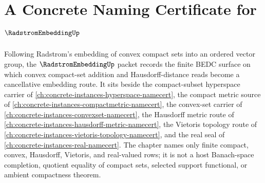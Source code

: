\chapter{A Concrete Naming Certificate for $\RadstromEmbeddingUp$}
\label{ch:concrete-instances-radstrom-embedding-namecert}

Following Radstrom's embedding of convex compact sets into an ordered vector group, the $\RadstromEmbeddingUp$ packet records the finite BEDC surface on which convex compact-set addition and Hausdorff-distance reads become a cancellative embedding route. It sits beside the compact-subset hyperspace carrier of \autoref{ch:concrete-instances-hyperspace-namecert}, the compact metric source of \autoref{ch:concrete-instances-compactmetric-namecert}, the convex-set carrier of \autoref{ch:concrete-instances-convexset-namecert}, the Hausdorff metric route of \autoref{ch:concrete-instances-hausdorff-metric-namecert}, the Vietoris topology route of \autoref{ch:concrete-instances-vietoris-topology-namecert}, and the real seal of \autoref{ch:concrete-instances-real-namecert}. The chapter names only finite compact, convex, Hausdorff, Vietoris, and real-valued rows; it is not a host Banach-space completion, quotient equality of compact sets, selected support functional, or ambient compactness theorem.

